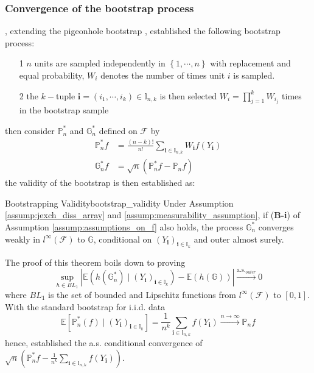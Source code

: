 \documentclass[twoside]{article}
\begin{document}
\subsubsection{Convergence of the bootstrap process} \citet{davezies2021empirical}, extending the pigeonhole bootstrap \citep{mccullagh2000resampling,owen2007pigeonhole}, established the following bootstrap process:
\begin{itemize}
    \item[1] $n$ units are sampled independently in $\left\{1,\cdots,n\right\}$ with replacement and equal probability, $W_i$ denotes the number of times unit $i$ is sampled.
    \item[2] the $k-$tuple $\mathbf{i}= \left(i_1,\cdots,i_k\right)\in\mathbb{I}_{n,k}$ is then selected $W_i=\prod^k_{j=1}W_{i_j}$ times in the bootstrap sample 
\end{itemize}
then consider $\mathbb{P}^*_n$ and $\mathbb{G}^*_n$ defined on $\mathcal{F}$ by 
\begin{align*}
    \mathbb{P}^*_n f &= \frac{(n-k)!}{n!}\sum_{\mathbf{i}\in\mathbb{I}_{n,k}}W_{\mathbf{i}} f(Y_{\mathbf{i}})\\
    \mathbb{G}^*_n f &= \sqrt{n}\left(\mathbb{P}^*_{n} f - \mathbb{P}_n f\right)
\end{align*}
the validity of the bootstrap is then established as:
\begin{theorem}{Bootstrapping Validity}{bootstrap_validity}
    Under Assumption \ref{assump:jexch_diss_array} and \ref{assump:measurability_assumption}, if (\textbf{B-i}) of Assumption \ref{assump:assumptions_on_f} also holds, the process $\mathbb{G}^*_n$ converges weakly in $l^{\infty}(\mathcal{F})$ to $\mathbb{G}$, conditional on $\left(Y_{\mathbf{i}}\right)_{\mathbf{i}\in\mathbb{I}_k}$ and outer almost surely.
\end{theorem}
The proof of this theorem boils down to proving
$$
\sup_{h\in BL_1} \left\vert \mathbb{E}\left(h\left(\mathbb{G}^*_n\right) \mid \left(Y_{\mathbf{i}}\right)_{\mathbf{i}\in \mathbb{I}_k}\right)  - \mathbb{E}\left(h(\mathbb{G})\right) \right\vert \xrightarrow{\mathrm{a.s.}_{outer}} 0 
$$
where $BL_1$ is the set of bounded and Lipschitz functions from $l^{\infty}(\mathcal{F})$ to $[0,1]$. With the standard bootstrap for i.i.d. data
$$
\mathbb{E} \left[\mathbb{P}^*_n(f)\mid \left(Y_{\mathbf{i}}\right)_{\mathbf{i}\in\mathbb{I}_k}\right] = \frac{1}{n^k} \sum_{\mathbf{i}\in\mathbb{I}_{n,k}} f(Y_{\mathbf{i}}) \xrightarrow{n\rightarrow \infty} \mathbb{P}_n f
$$
hence, \citet{davezies2021empirical} established the a.s. conditional convergence of $\sqrt{n}\left( \mathbb{P}^*_n f - \frac{1}{n^k} \sum_{\mathbf{i}\in\mathbb{I}_{n,k}} f(Y_{\mathbf{i}}) \right)$.
\end{document}

